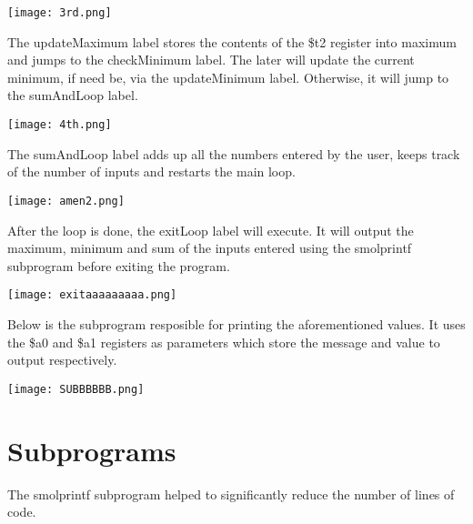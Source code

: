 \documentclass{article}
\begin{document}
\begin{center}
  \texttt{[image: 3rd.png]}
\end{center}

The updateMaximum label stores the contents of the \$t2 register into
maximum and jumps to the checkMinimum label. The later will update the
current minimum, if need be, via the updateMinimum label. Otherwise,
it will jump to the sumAndLoop label.

\begin{center}
  \texttt{[image: 4th.png]}
\end{center}

The sumAndLoop label adds up all the numbers entered by the user,
keeps track of the number of inputs and restarts the main loop.

\begin{center}
  \texttt{[image: amen2.png]}
\end{center}

After the loop is done, the exitLoop label will execute. It will
output the maximum, minimum and sum of the inputs entered using the 
smolprintf subprogram before exiting the program.

\begin{center}
  \texttt{[image: exitaaaaaaaaa.png]}
\end{center}

Below is the subprogram resposible for printing the aforementioned
values. It uses the \$a0 and \$a1 registers as parameters which store
the message and value to output respectively.

\begin{center}
  \texttt{[image: SUBBBBBB.png]}
\end{center}

\section{Subprograms}
The smolprintf subprogram helped to significantly reduce the number
of lines of code.
\end{document}
